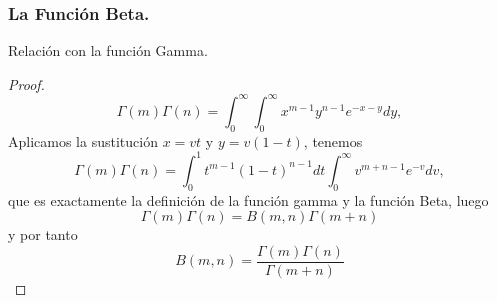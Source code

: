 \documentclass{beamer}
\begin{document}
	\begin{frame}
	\frametitle{La Función Beta.}
	\begin{block}{Relación con la función Gamma.}
		\begin{proof}
			$$\Gamma(m)\Gamma(n) = \int_{0}^{\infty}\int_{0}^{\infty} x^{m-1} y^{n-1}e^{-x-y} dy,$$
			Aplicamos la sustitución $x = vt$ y $y = v(1-t)$, tenemos
			$$\Gamma(m)\Gamma(n) = \int_{0}^{1} t^{m-1}(1-t)^{n-1} dt \int_{0}^{\infty} v^{m+n-1}e^{-v} dv,$$
			que es exactamente la definición de la función gamma y la función Beta, luego
			$$\Gamma(m)\Gamma(n) = B(m,n)\Gamma(m+n)$$
			y por tanto
			$$B(m,n) = \frac{\Gamma(m)\Gamma(n)}{\Gamma(m+n)}$$
		\end{proof}
	\end{block}
	\end{frame}
\end{document}
